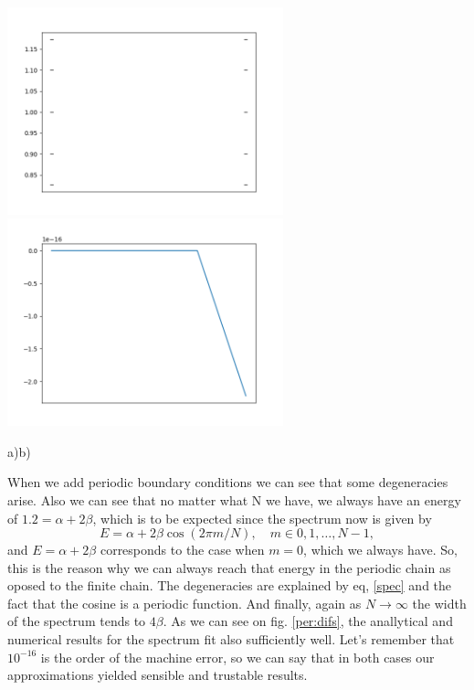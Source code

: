 \begin{questions}
\begin{solution}
 \includegraphics[width=80mm]{fin_comp.png}
 \includegraphics[width=80mm]{fin_dif_plot.png}\label{fin:difs}

 \hspace{4cm}a)\hspace{7.7cm}b)


\end{solution}

\begin{solution}
  When we add periodic boundary conditions we can see that some degeneracies arise. Also we can see that no matter what N we have, we always have an energy of $1.2 = \alpha + 2\beta$, which is to be expected since the spectrum now is given by
  \begin{equation}
    E = \alpha + 2\beta\cos{(2\pi m/N)}, \quad m\in{0,1,\ldots,N-1},
    \label{spec}
  \end{equation}
  and $E = \alpha + 2\beta$ corresponds to the case when $m = 0$, which we always have. So, this is the reason why we can always reach that energy in the periodic chain as oposed to the finite chain. The degeneracies are explained by eq, \ref{spec} and the fact that the cosine is a periodic function. And finally, again as $N \rightarrow \infty$ the width of the spectrum tends to $4\beta$. As we can see on fig. \ref{per:difs}, the anallytical and numerical results for the spectrum fit also sufficiently well. Let's remember that $10^{-16}$ is the order of the machine error, so we can say that in both cases our approximations yielded sensible and trustable results.


\end{solution}
\end{questions}
